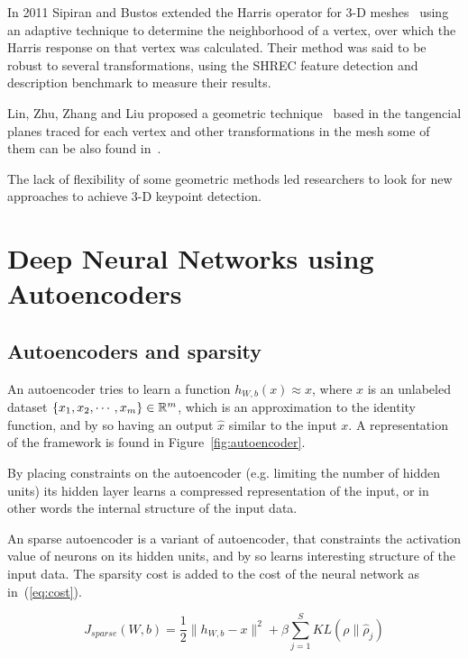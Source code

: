 \documentclass{comjnl}
\begin{document}
In 2011 Sipiran and Bustos extended the Harris operator for 3-D
meshes~\cite{Sipiran2011} using an adaptive technique to determine the neighborhood
of a vertex, over which the Harris response on that vertex was calculated.
Their method was said to be robust to several transformations, using the SHREC
feature detection and description benchmark to measure their results.

Lin, Zhu, Zhang and Liu proposed a geometric technique~\cite{Lin2016SparseRefinement} based in the
tangencial planes traced for each vertex and other transformations in the mesh 
some of them can be also found in~\cite{Lin2016}. 

The lack of flexibility of some geometric methods led researchers to look for
new approaches to achieve 3-D keypoint detection.

\section{Deep Neural Networks using Autoencoders} \label{NeuralNetworkIntro}

\subsection{Autoencoders and sparsity}
An autoencoder tries to learn a function $h_{W,b}(x) \approx x$, where
$x$ is an unlabeled dataset $\{x_{1}, x_{2}, \cdots, x_{m}\} \in \Bbb R ^{m}$,
which is an approximation to the identity function, and by so having an output
$\hat{x}$ similar to the input $x$. A representation of the framework is found
in Figure~\ref{fig:autoencoder}.

By placing constraints on the autoencoder (e.g. limiting the number of hidden
units) its hidden layer learns a compressed representation of the input, or in
other words the internal structure of the input data.

An sparse autoencoder is a variant of autoencoder, that constraints the activation
value of neurons on its hidden units, and by so learns interesting structure of the input
data. The sparsity cost is added to the cost of the neural network as in~(\ref{eq:cost}).

\begin{equation}\label{eq:cost}
    J_{sparse}(W, b) = \frac{1}{2} \|h_{W, b}-x\|^{2} + \beta \sum_{j=1}^{S}{KL(\rho\|\hat{\rho}_{j})}
\end{equation}
\end{document}
